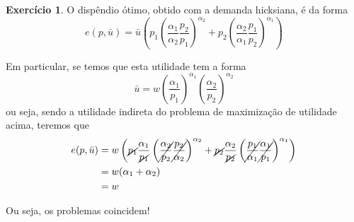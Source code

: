 \documentclass[12pt]{article}
\numberwithin{equation}{section}
\theoremstyle{plain}
\theoremstyle{definition}
\newtheorem{exercise}{Exercício}
\theoremstyle{remark}
\begin{document}
\begin{exercise}
  O dispêndio ótimo, obtido com a demanda hicksiana, é da forma
  \[
  e(p, \bar{u}) = \bar{u} \left( p_{1} \left( \frac{\alpha_{1}}{\alpha_{2}} \frac{p_{2}}{p_{1}} \right)^{\alpha_{2}} + p_{2} \left( \frac{\alpha_{2}}{\alpha_{1}} \frac{p_{1}}{p_{2}} \right)^{\alpha_{1}} \right)
  \]

  Em particular, se temos que esta utilidade tem a forma
  \[
  \bar{u} = w \left( \frac{\alpha_{1}}{p_{1}} \right)^{\alpha_{1}} \left( \frac{\alpha_{2}}{p_{2}} \right)^{\alpha_{2}}
  \]
  ou seja, sendo a utilidade indireta do problema de maximização de utilidade acima, teremos que
  \begin{align*}
    e(p, \bar{u}) &= w \left( \cancel{ p_{1} } \frac{\alpha_{1}}{\cancel{ p_{1} }} \left( \cancel{ \frac{\alpha_{2}}{p_{2}} } \cancel{ \frac{p_{2}}{\alpha_{2}} } \right)^{\alpha_{2}} + \cancel{ p_{2} } \frac{\alpha_{2}}{\cancel{ p_{2} }} \left( \cancel{ \frac{p_{1}}{\alpha_{1}} } \cancel{ \frac{\alpha_{1}}{p_{1}} } \right)^{\alpha_{1}}  \right) \\
    &= w (\alpha_1 + \alpha_2) \\
    &= w
  \end{align*}

  Ou seja, os problemas coincidem!
\end{exercise}
\end{document}
